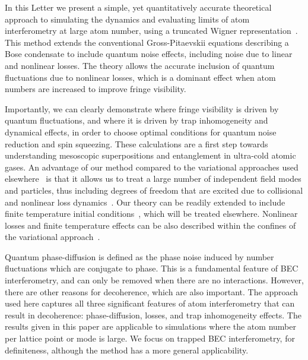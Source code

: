 \documentclass[aps,prl,twocolumn,showpacs,amsmath,amssymb,superscriptaddress,flushbottom,noraggedfooter]{revtex4-1}
\begin{document}
In this Letter we present a simple, yet quantitatively accurate theoretical approach
to simulating the dynamics and evaluating limits of atom interferometry at large atom number,
using a truncated Wigner representation~\cite{Drummond1993,Steel1998,Sinatra2002}.
This method extends the conventional Gross-Pitaevskii equations
describing a Bose condensate to include quantum noise effects,
including noise due to linear and nonlinear losses.
The theory allows the accurate inclusion of quantum fluctuations due to nonlinear losses,
which is a dominant effect when atom numbers are increased to improve fringe visibility.

Importantly, we can clearly demonstrate where fringe visibility is driven by quantum fluctuations,
and where it is driven by trap inhomogeneity and dynamical effects,
in order to choose optimal conditions for quantum noise reduction and spin squeezing.
These calculations are a first step towards understanding mesoscopic superpositions and entanglement in ultra-cold atomic gases.
An advantage of our method compared to the variational approaches used elsewhere~\cite{Li2009,Sakmann2009}
is that it allows us to treat a large number of independent field modes and particles,
thus including degrees of freedom that are excited due to
collisional and nonlinear loss dynamics~\cite{Norrie2005,Deuar2007}.
Our theory can be readily extended to include finite temperature initial conditions~\cite{Steel1998,Isella2006},
which will be treated elsewhere.
Nonlinear losses and finite temperature effects can be also described within the confines of the variational approach~\cite{Li2008,Sinatra2011}.

Quantum phase-diffusion is defined as the phase noise induced by number fluctuations
which are conjugate to phase.
This is a fundamental feature of BEC interferometry, and can only be removed when there are no interactions.
However, there are other reasons for decoherence, which are also important.
The approach used here captures all three significant features of atom
interferometry that can result in decoherence: phase-diffusion, losses,
and trap inhomogeneity effects.
The results given in this paper are applicable to simulations where the
atom number per lattice point or mode is large.
We focus on trapped BEC interferometry, for definiteness, although the method has a more general applicability.
\end{document}
